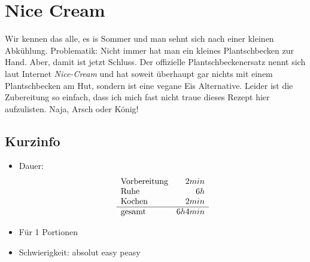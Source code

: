 \section{Nice Cream}
  \label{GERICHTTYPE:GERICHTNAME}
    
    Wir kennen das alle, es is Sommer und man sehnt sich nach einer kleinen
    Abkühlung. Problematik: Nicht immer hat man ein kleines Plantschbecken zur
    Hand. Aber, damit ist jetzt Schluss. Der offizielle Plantschbeckenersatz
    nennt sich laut Internet \emph{Nice-Cream} und hat soweit überhaupt gar
    nichts mit einem Plantschbecken am Hut, sondern ist eine vegane Eis
    Alternative. Leider ist die Zubereitung so einfach, dass ich mich fast nicht
    traue dieses Rezept hier aufzulisten. Naja, Arsch oder König!

    \subsection*{Kurzinfo}
      \begin{itemize}
        \item Dauer:
          \begin{displaymath}
            \begin{array}{l r}
              \text{Vorbereitung} & 2min\\
              \text{Ruhe} & 6h\\
              \text{Kochen} & 2min\\ \hline
              \text{gesamt} &6h4min
            \end{array}
          \end{displaymath}
        \item Für 1 Portionen
        \item Schwierigkeit: absolut easy peasy
      \end{itemize}

